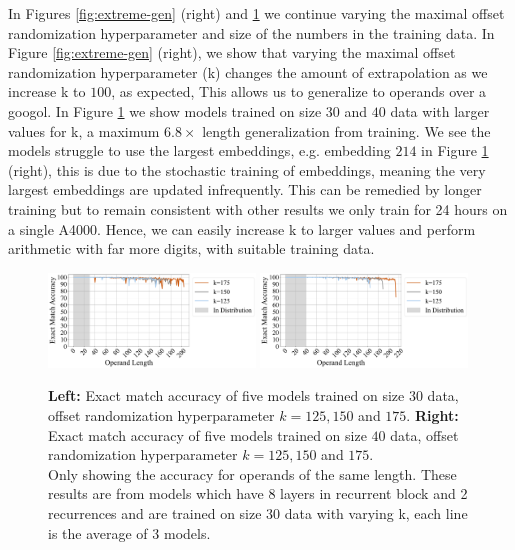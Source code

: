 \documentclass{article}
\begin{document}
In Figures \ref{fig:extreme-gen} (right) and \ref{fig:extreme-gen-2} we continue varying the maximal offset randomization hyperparameter and size of the numbers in the training data.
In Figure \ref{fig:extreme-gen} (right), we show that varying the maximal offset randomization hyperparameter (k) changes the amount of extrapolation as we increase k to \(100\), as expected,
This allows us to generalize to operands over a googol.
In Figure \ref{fig:extreme-gen-2} we show models trained on size \(30\) and \(40\) data with larger values for k, a maximum \(6.8\times\) length generalization from training.
We see the models struggle to use the largest embeddings, e.g. embedding \(214\) in Figure \ref{fig:extreme-gen-2} (right), this is due to the stochastic training of embeddings, meaning the very largest embeddings are updated infrequently. 
This can be remedied by longer training but to remain consistent with other results we only train for 24 hours on a single A4000.
Hence, we can easily increase k to larger values and perform arithmetic with far more digits, with suitable training data.

\begin{figure}[ht!]
    \centering
    \includegraphics[width=0.49\textwidth]{Figures/plot_22.pdf}
    \includegraphics[width=0.49\textwidth]{Figures/plot_23.pdf}
    \caption{
    \textbf{Left:} Exact match accuracy of five models trained on size \(30\) data, offset randomization hyperparameter \(k=125,150\) and \(175\).
    \textbf{Right:} Exact match accuracy of five models trained on size \(40\) data, offset randomization hyperparameter \(k=125,150\) and \(175\).\\
    Only showing the accuracy for operands of the same length. These results are from models which have 8 layers in recurrent block and 2 recurrences and are trained on size 30 data with varying k, each line is the average of 3 models.
    }
    \label{fig:extreme-gen-2}
\end{figure}
\end{document}
